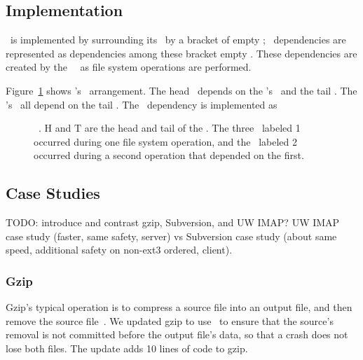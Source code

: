 
\subsection{Implementation}
\label{sec:opgroup:implementation}

\Anopgroup\ is implemented by surrounding its \patches\ by a bracket of
empty \patches; \opgroup\ dependencies are represented as dependencies
among these bracket empty \patches.
%
These dependencies are created by the \opgroup\ \module\ as file
system operations are performed.

Figure~\ref{fig:opgroup-chdescs} shows \anopgroup's \chdesc\ arrangement.
%
The head \chdesc\ depends on the \opgroup's \chdescs\ and the tail
\chdesc.
%
The \opgroup's \chdescs\ all depend on the tail \chdesc.
%
The \opgroup\ dependency  is implemented as

\begin{figure}[htb]
\caption{\label{fig:opgroup-chdescs} \Opgroup\ \chdescs. H and T are the head
  and tail of the \opgroup.
  The three \chdescs\ labeled 1 occurred during one file system
  operation,
  and the \chdesc\ labeled 2 occurred during a second operation that
  depended on the first.}
\end{figure}

\subsection{Case Studies}
\label{sec:opgroup:casestudies}

TODO: introduce and contrast gzip, Subversion, and UW IMAP?
%
UW IMAP case study (faster, same safety, server) vs
Subversion case study (about same speed, additional safety on non-ext3
ordered, client).

\subsubsection{Gzip}
\label{sec:opgroup:gzip}

Gzip's typical operation is to compress a source file into an output file,
and then remove the source file~\cite{gzip}.
%
We updated gzip to use \opgroups\ to ensure that the source's removal
is not committed before the output file's data, so that a crash does
not lose both files. The update adds 10 lines of code to gzip.

